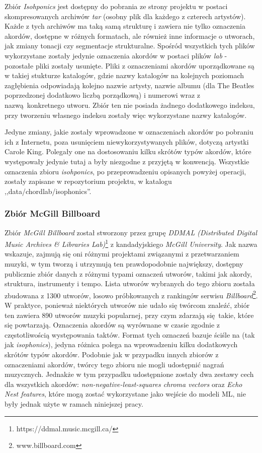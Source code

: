 Zbiór \emph{Isohponics} jest dostępny do pobrania ze strony projektu w postaci skompresowanych
archiwów \emph{tar} (osobny plik dla każdego z czterech artystów). Każde z tych archiwów ma taką
samą strukturę i zawiera nie tylko oznaczenia akordów, dostępne w różnych formatach, ale również
inne informacje o utworach, jak zmiany tonacji czy segmentacje strukturalne. Spośród wszystkich tych
plików wykorzystane zostały jedynie oznaczenia akordów w postaci plików \emph{lab} - pozostałe pliki
zostały usunięte. Pliki z oznaczeniami akordów uporządkowane są w takiej stukturze katalogów, gdzie
nazwy katalogów na kolejnych poziomach zagłębienia odpowiadają kolejno nazwie artysty, nazwie albumu
(dla The Beatles poprzedzonej dodatkowo liczbą porządkową) i numerowi wraz z nazwą konkretnego
utworu. Zbiór ten nie posiada żadnego dodatkowego indeksu, przy tworzeniu własnego indeksu zostały
więc wykorzystane nazwy katalogów.

Jedyne zmiany, jakie zostały wprowadzone w oznaczeniach akordów po pobraniu ich z Internetu, poza
usunięciem niewykorzystywanych plików, dotyczą artystki Carole King. Polegały one na dostosowaniu
kilku skrótów typów akordów, które występowały jedynie tutaj a były niezgodne z przyjętą w
\cite{harte_towards_nodate} konwencją.  Wszystkie oznaczenia zbioru \emph{isohponics}, po
przeprowadzeniu opisanych powyżej operacji, zostały zapisane w repozytorium projektu, w katalogu
,,data/chordlab/isophonics''.


\subsubsection{Zbiór McGill Billboard}

Zbiór \emph{McGill Billboard} \cite{burgoyne_expert_2011} został stworzony przez grupę \emph{DDMAL
(Distributed Digital Music Archives \& Libraries Lab)}\footnote{https://ddmal.music.mcgill.ca/} z
kandadyjskiego \emph{McGill University}. Jak nazwa wskazuje, zajmują się oni różnymi projektami
związanymi z przetwarzaniem muzyki, w tym tworzą i utrzymują ten prawdopodobnie największy, dostępny
publicznie zbiór danych z różnymi typami oznaczeń utworów, takimi jak akordy, struktura, instrumenty
i tempo. Lista utworów wybranych do tego zbioru została zbudowana z 1300 utworów, losowo
próbkowanych z rankingów serwisu \emph{Billboard}\footnote{www.billboard.com}. W praktyce, ponieważ
niektórych utworów nie udało się twórcom znaleźć, zbiór ten zawiera 890 utworów muzyki popularnej,
przy czym zdarzają się takie, które się powtarzają. Oznaczenia akordów są wyrównane w czasie zgodnie
z częstotliwością występowania taktów. Format tych oznaczeń bazuje ściśle na
\cite{harte_towards_nodate} (tak jak \emph{isophonics}), jedyna różnica polega na wprowadzeniu kilku
dodatkowych skrótów typów akordów.  Podobnie jak w przypadku innych zbiorów z oznaczeniami akordów,
twórcy tego zbioru nie mogli udostępnić nagrań muzycznych. Jednakże w tym przypadku udostępnione
zostały dwa zestawy cech dla wszystkich akordów: \emph{non-negative-least-squares chroma vectors}
oraz \emph{Echo Nest features}, które mogą zostać wykorzystane jako wejście do modeli ML, nie były
jednak użyte w ramach niniejszej pracy.

